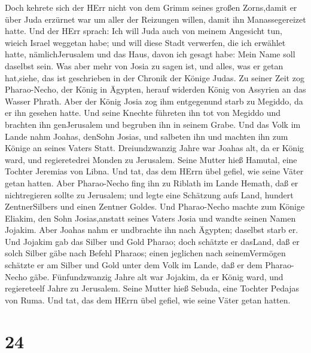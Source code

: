  Doch kehrete sich der HErr nicht von dem Grimm seines
großen Zorns,damit er über Juda erzürnet war um aller der Reizungen
willen, damit ihn Manassegereizet hatte.  Und der HErr
sprach: Ich will Juda auch von meinem Angesicht tun, wieich Israel
weggetan habe; und will diese Stadt verwerfen, die ich erwählet hatte,
nämlichJerusalem und das Haus, davon ich gesagt habe: Mein Name soll
daselbst sein.  Was aber mehr von Josia zu sagen ist, und
alles, was er getan hat,siehe, das ist geschrieben in der Chronik der
Könige Judas.  Zu seiner Zeit zog Pharao-Necho, der König
in Ägypten, herauf widerden König von Assyrien an das Wasser Phrath.
Aber der König Josia zog ihm entgegenund starb zu Megiddo, da er ihn
gesehen hatte.  Und seine Knechte führeten ihn tot von
Megiddo und brachten ihn genJerusalem und begruben ihn in seinem Grabe.
Und das Volk im Lande nahm Joahas, denSohn Josias, und salbeten ihn und
machten ihn zum Könige an seines Vaters Statt. 
Dreiundzwanzig Jahre war Joahas alt, da er König ward, und regieretedrei
Monden zu Jerusalem. Seine Mutter hieß Hamutal, eine Tochter Jeremias
von Libna.  Und tat, das dem HErrn übel gefiel, wie seine
Väter getan hatten.  Aber Pharao-Necho fing ihn zu Riblath
im Lande Hemath, daß er nichtregieren sollte zu Jerusalem; und legte
eine Schätzung aufs Land, hundert ZentnerSilbers und einen Zentner
Goldes.  Und Pharao-Necho machte zum Könige Eliakim, den
Sohn Josias,anstatt seines Vaters Josia und wandte seinen Namen Jojakim.
Aber Joahas nahm er undbrachte ihn nach Ägypten; daselbst starb er.
 Und Jojakim gab das Silber und Gold Pharao; doch schätzte
er dasLand, daß er solch Silber gäbe nach Befehl Pharaos; einen
jeglichen nach seinemVermögen schätzte er am Silber und Gold unter dem
Volk im Lande, daß er dem Pharao-Necho gäbe. 
Fünfundzwanzig Jahre alt war Jojakim, da er König ward, und regiereteelf
Jahre zu Jerusalem. Seine Mutter hieß Sebuda, eine Tochter Pedajas von
Ruma.  Und tat, das dem HErrn übel gefiel, wie seine Väter
getan hatten.

\hypertarget{section-23}{%
\section{24}\label{section-23}}

